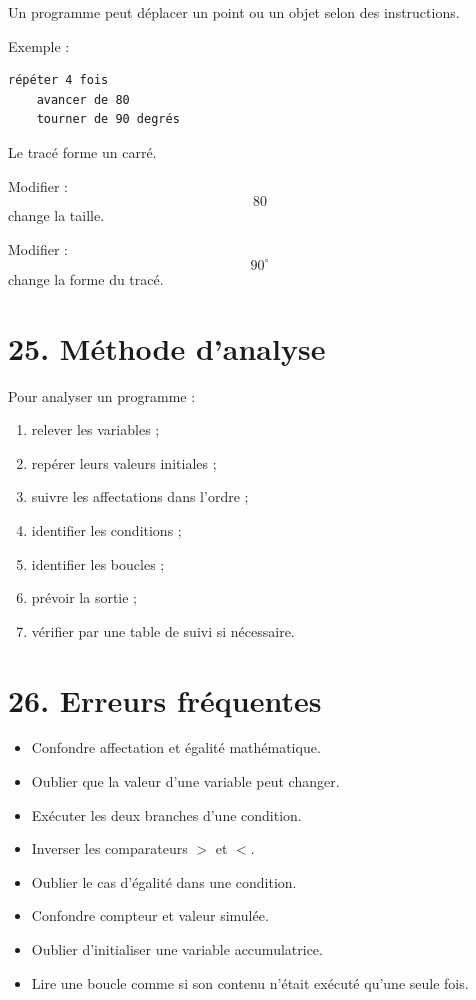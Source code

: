 Un programme peut déplacer un point ou un objet selon des instructions.

Exemple :
\begin{verbatim}
répéter 4 fois
    avancer de 80
    tourner de 90 degrés
\end{verbatim}

Le tracé forme un carré.

Modifier :
\[
80
\]
change la taille.

Modifier :
\[
90^\circ
\]
change la forme du tracé.

\section{25. Méthode d'analyse}

\begin{methode}
Pour analyser un programme :
\begin{enumerate}
\item relever les variables ;
\item repérer leurs valeurs initiales ;
\item suivre les affectations dans l'ordre ;
\item identifier les conditions ;
\item identifier les boucles ;
\item prévoir la sortie ;
\item vérifier par une table de suivi si nécessaire.
\end{enumerate}
\end{methode}

\section{26. Erreurs fréquentes}

\begin{itemize}
\item Confondre affectation et égalité mathématique.
\item Oublier que la valeur d'une variable peut changer.
\item Exécuter les deux branches d'une condition.
\item Inverser les comparateurs $>$ et $<$.
\item Oublier le cas d'égalité dans une condition.
\item Confondre compteur et valeur simulée.
\item Oublier d'initialiser une variable accumulatrice.
\item Lire une boucle comme si son contenu n'était exécuté qu'une seule fois.
\end{itemize}

